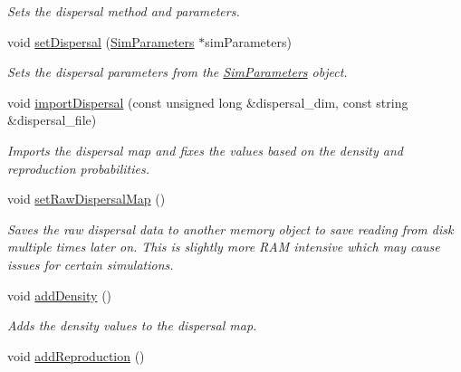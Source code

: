 \begin{DoxyCompactItemize}
\begin{DoxyCompactList}\small\item\em Sets the dispersal method and parameters. \end{DoxyCompactList}\item 
void \hyperlink{class_dispersal_coordinator_a8504699586755df070b44da71ea346a5}{set\+Dispersal} (\hyperlink{struct_sim_parameters}{Sim\+Parameters} $\ast$sim\+Parameters)
\begin{DoxyCompactList}\small\item\em Sets the dispersal parameters from the \hyperlink{struct_sim_parameters}{Sim\+Parameters} object. \end{DoxyCompactList}\item 
void \hyperlink{class_dispersal_coordinator_afe53c51858899e9918e95ff120813fa8}{import\+Dispersal} (const unsigned long \&dispersal\+\_\+dim, const string \&dispersal\+\_\+file)
\begin{DoxyCompactList}\small\item\em Imports the dispersal map and fixes the values based on the density and reproduction probabilities. \end{DoxyCompactList}\item 
void \hyperlink{class_dispersal_coordinator_a87155f185490f98569723eb867440c51}{set\+Raw\+Dispersal\+Map} ()\hypertarget{class_dispersal_coordinator_a87155f185490f98569723eb867440c51}{}\label{class_dispersal_coordinator_a87155f185490f98569723eb867440c51}

\begin{DoxyCompactList}\small\item\em Saves the raw dispersal data to another memory object to save reading from disk multiple times later on. This is slightly more R\+AM intensive which may cause issues for certain simulations. \end{DoxyCompactList}\item 
void \hyperlink{class_dispersal_coordinator_af73768c49f869a89cccaa203e7b6e423}{add\+Density} ()
\begin{DoxyCompactList}\small\item\em Adds the density values to the dispersal map. \end{DoxyCompactList}\item 
void \hyperlink{class_dispersal_coordinator_a4f3c173f02fc9fcfad73a5cc470e7994}{add\+Reproduction} ()\hypertarget{class_dispersal_coordinator_a4f3c173f02fc9fcfad73a5cc470e7994}{}\label{class_dispersal_coordinator_a4f3c173f02fc9fcfad73a5cc470e7994}


\end{DoxyCompactItemize}
